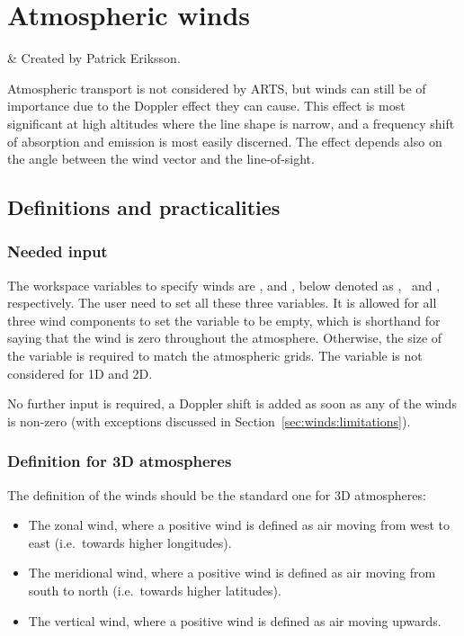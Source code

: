 \chapter{Atmospheric winds}
 \label{sec:winds}


  & Created by Patrick Eriksson.\\
 \stophistory


 Atmospheric transport is not considered by ARTS, but winds can still be of
 importance due to the Doppler effect they can cause. This effect is most
 significant at high altitudes where the line shape is narrow, and a frequency
 shift of absorption and emission is most easily discerned. The effect depends
 also on the angle between the wind vector and the line-of-sight.



\section{Definitions and practicalities}
\label{sec:winds:defs}

\subsection{Needed input}
%
The workspace variables to specify winds are ,
 and , below denoted as
\WindWE, \WindSN\ and \WindVe, respectively. The user need to set all these
three variables. It is allowed for all three wind components to set the
variable to be empty, which is shorthand for saying that the wind is zero
throughout the atmosphere. Otherwise, the size of the variable is required to
match the atmospheric grids. The variable  is not
considered for 1D and 2D.

No further input is required, a Doppler shift is
added as soon as any of the winds is non-zero (with exceptions discussed in
Section~\ref{sec:winds:limitations}).


\subsection{Definition for 3D atmospheres}
%
The definition of the winds should be the standard one for 3D atmospheres:
\begin{itemize}
\item[\WindWE] The zonal wind, where a positive wind is defined as air moving
  from west to east (i.e.\ towards higher longitudes).
\item[\WindSN] The meridional wind, where a positive wind is defined as air
  moving from south to north (i.e.\ towards higher latitudes).
\item[\WindVe] The vertical wind, where a positive wind is defined as air
  moving upwards.
\end{itemize}


